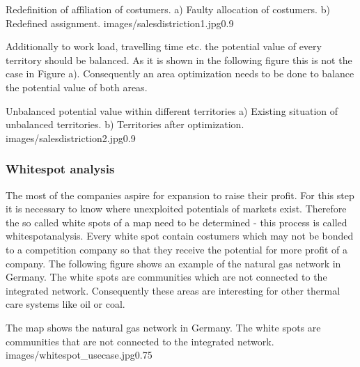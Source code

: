 \begin{figurevarSize}{Redefinition of affiliation of costumers. a) Faulty allocation of costumers. b) Redefined assignment. \cite{zimtec}}{images/salesdistriction1.jpg}{0.9}\end{figurevarSize} 

Additionally to work load, travelling time etc. the potential value of every territory should be balanced. As it is shown in the following figure this is not the case in Figure a). Consequently an area optimization needs to be done to balance the potential value of both areas.

\begin{figurevarSize}{Unbalanced potential value within different territories a) Existing situation of unbalanced territories. b) Territories after optimization. \cite{zimtec}}{images/salesdistriction2.jpg}{0.9}\end{figurevarSize} 

\subsubsection{Whitespot analysis}
The most of the companies aspire for expansion to raise their profit. For this step it is necessary to know where unexploited potentials of markets exist. Therefore the so called white spots of a map need to be determined - this process is called whitespotanalysis. Every white spot contain costumers which may not be bonded to a competition company so that they receive the potential for more profit of a company. The following figure shows an example of the natural gas network in Germany. The white spots are communities which are not connected to the integrated network. Consequently these areas are interesting for other thermal care systems like oil or coal. 

\begin{figurevarSize}{The map shows the natural gas network in Germany. The white spots are communities that are not connected to the integrated network. \cite{tappert}}{images/whitespot_usecase.jpg}{0.75}\end{figurevarSize} 
